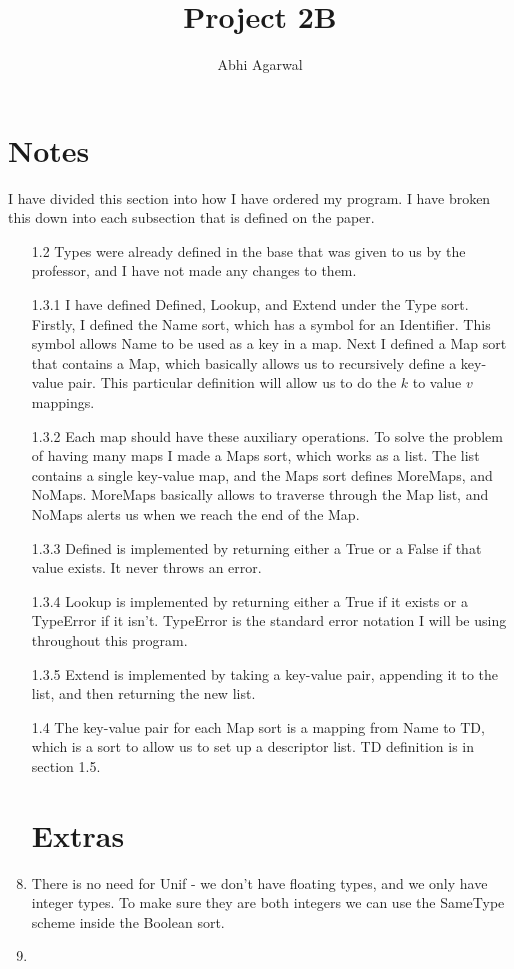 \documentclass[11pt, oneside]{article}
\title{Project 2B}
\author{Abhi Agarwal}
\date{}
\begin{document}
\maketitle
\section*{Notes}
\par I have divided this section into how I have ordered my program. I have broken this down into each subsection that is defined on the paper. 
\begin{enumerate}
\item[1.2] Types were already defined in the base that was given to us by the professor, and I have not made any changes to them. 
\item[1.3.1] I have defined Defined, Lookup, and Extend under the Type sort. Firstly, I defined the Name sort, which has a symbol for an Identifier. This symbol allows Name to be used as a key in a map. Next I defined a Map sort that contains a Map, which basically allows us to recursively define a key-value pair. This particular definition will allow us to do the $k$ to value $v$ mappings.
\item[1.3.2] Each map should have these auxiliary operations. To solve the problem of having many maps I made a Maps sort, which works as a list. The list contains a single key-value map, and the Maps sort defines MoreMaps, and NoMaps. MoreMaps basically allows to traverse through the Map list, and NoMaps alerts us when we reach the end of the Map. 
\item[1.3.3] Defined is implemented by returning either a True or a False if that value exists. It never throws an error. 
\item[1.3.4] Lookup is implemented by returning either a True if it exists or a TypeError if it isn't. TypeError is the standard error notation I will be using throughout this program. 
\item[1.3.5] Extend is implemented by taking a key-value pair, appending it to the list, and then returning the new list.
\item[1.4] The key-value pair for each Map sort is a mapping from Name to TD, which is a sort to allow us to set up a descriptor list. TD definition is in section 1.5. 

\section{Extras}
\item There is no need for Unif - we don't have floating types, and we only have integer types. To make sure they are both integers we can use the SameType scheme inside the Boolean sort.
\item 

\end{enumerate}
\end{document}
